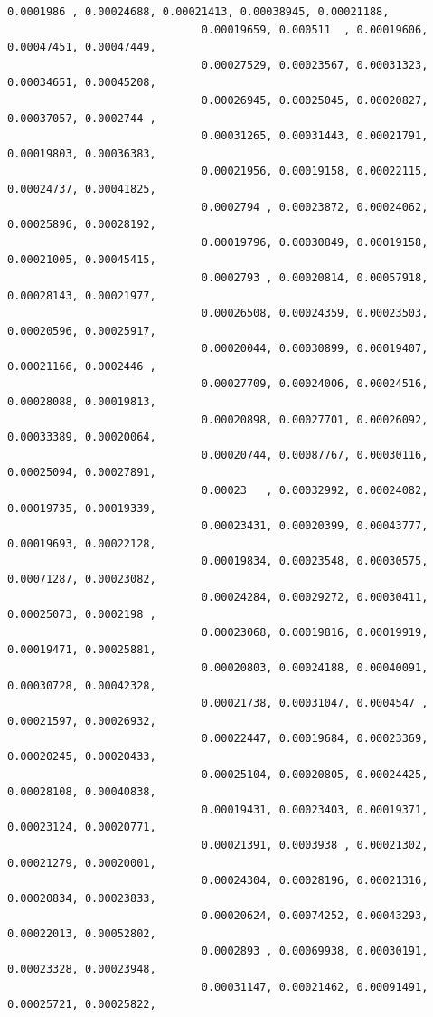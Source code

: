 \documentclass[11pt]{article}
\begin{document}
\begin{Verbatim}[commandchars=\\\{\}]
                              0.0001986 , 0.00024688, 0.00021413, 0.00038945, 0.00021188,
                              0.00019659, 0.000511  , 0.00019606, 0.00047451, 0.00047449,
                              0.00027529, 0.00023567, 0.00031323, 0.00034651, 0.00045208,
                              0.00026945, 0.00025045, 0.00020827, 0.00037057, 0.0002744 ,
                              0.00031265, 0.00031443, 0.00021791, 0.00019803, 0.00036383,
                              0.00021956, 0.00019158, 0.00022115, 0.00024737, 0.00041825,
                              0.0002794 , 0.00023872, 0.00024062, 0.00025896, 0.00028192,
                              0.00019796, 0.00030849, 0.00019158, 0.00021005, 0.00045415,
                              0.0002793 , 0.00020814, 0.00057918, 0.00028143, 0.00021977,
                              0.00026508, 0.00024359, 0.00023503, 0.00020596, 0.00025917,
                              0.00020044, 0.00030899, 0.00019407, 0.00021166, 0.0002446 ,
                              0.00027709, 0.00024006, 0.00024516, 0.00028088, 0.00019813,
                              0.00020898, 0.00027701, 0.00026092, 0.00033389, 0.00020064,
                              0.00020744, 0.00087767, 0.00030116, 0.00025094, 0.00027891,
                              0.00023   , 0.00032992, 0.00024082, 0.00019735, 0.00019339,
                              0.00023431, 0.00020399, 0.00043777, 0.00019693, 0.00022128,
                              0.00019834, 0.00023548, 0.00030575, 0.00071287, 0.00023082,
                              0.00024284, 0.00029272, 0.00030411, 0.00025073, 0.0002198 ,
                              0.00023068, 0.00019816, 0.00019919, 0.00019471, 0.00025881,
                              0.00020803, 0.00024188, 0.00040091, 0.00030728, 0.00042328,
                              0.00021738, 0.00031047, 0.0004547 , 0.00021597, 0.00026932,
                              0.00022447, 0.00019684, 0.00023369, 0.00020245, 0.00020433,
                              0.00025104, 0.00020805, 0.00024425, 0.00028108, 0.00040838,
                              0.00019431, 0.00023403, 0.00019371, 0.00023124, 0.00020771,
                              0.00021391, 0.0003938 , 0.00021302, 0.00021279, 0.00020001,
                              0.00024304, 0.00028196, 0.00021316, 0.00020834, 0.00023833,
                              0.00020624, 0.00074252, 0.00043293, 0.00022013, 0.00052802,
                              0.0002893 , 0.00069938, 0.00030191, 0.00023328, 0.00023948,
                              0.00031147, 0.00021462, 0.00091491, 0.00025721, 0.00025822,

\end{Verbatim}
\end{document}
